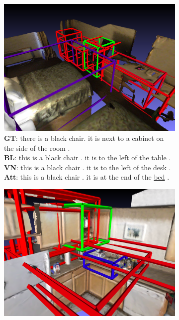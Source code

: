 \documentclass[10pt,twocolumn,letterpaper]{article}
\begin{document}
\begin{figure}
	\centering
	\begin{subfigure}[c]{.45\textwidth}
		\centering
		\includegraphics[width=\textwidth]{figures/gt_scene0221_00_3_0_att_02.png}
		\caption{
			\textbf{GT}: there is a black chair. it is next to a cabinet on the side of the room .\\
			\textbf{BL}: this is a black chair . it is to the left of the table .\\
			\textbf{VN}: this is a black chair . it is to the left of the desk .\\
			\textbf{Att}: this is a black chair . it is at the end of the \underline{bed} .}
		\label{fig:example_1}
	\end{subfigure}
	\begin{subfigure}[c]{.45\textwidth}
		\centering
		\includegraphics[width=\textwidth]{figures/gt_scene0164_00_2_0_att_06.png}

\end{subfigure}
\end{figure}
\end{document}
